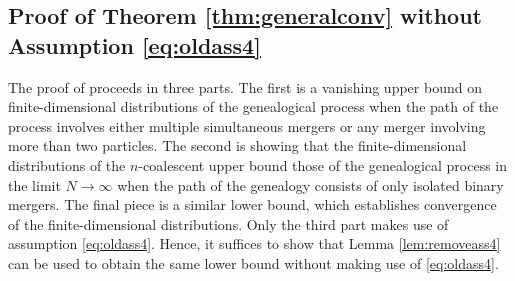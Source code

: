 \documentclass{article}
\theoremstyle{definition}
\newcommand{\1}[1]{\mathbbm{1}_{\{#1\}}}
\begin{document}
\subsection{Proof of Theorem \ref{thm:generalconv} without Assumption \eqref{eq:oldass4}}\label{sec:proof}

The proof of \citet[Theorem 1]{koskela2018} proceeds in three parts.
The first is a vanishing upper bound on finite-dimensional distributions of the genealogical process when the path of the process involves either multiple simultaneous mergers or any merger involving more than two particles.
The second is showing that the finite-dimensional distributions of the $n$-coalescent upper bound those of the genealogical process in the limit $N \rightarrow \infty$ when the path of the genealogy consists of only isolated binary mergers.
The final piece is a similar lower bound, which establishes convergence of the finite-dimensional distributions.
Only the third part makes use of assumption \eqref{eq:oldass4}.
Hence, it suffices to show that Lemma \ref{lem:removeass4} can be used to obtain the same lower bound without making use of \eqref{eq:oldass4}.
\end{document}
